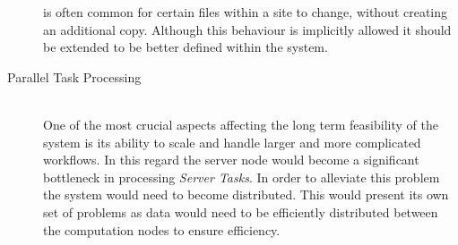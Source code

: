 \documentclass[12pt,a4paper]{report}
\begin{document}
\begin{description}
is often common for certain files within a site to change, without creating an
additional copy. Although this behaviour is implicitly allowed it should be
extended to be better defined within the system.
\item[Parallel Task Processing] \hfill \\
One of the most crucial aspects affecting the long term feasibility of the
system is its ability to scale and handle larger and more complicated workflows.
In this regard the server node would become a significant bottleneck in
processing \emph{Server Tasks}. In order to alleviate this problem the system
would need to become distributed. This would present its own set of problems
as data would need to be efficiently distributed between the computation nodes
to ensure efficiency.

\end{description}

{}

\appendix

\end{document}
